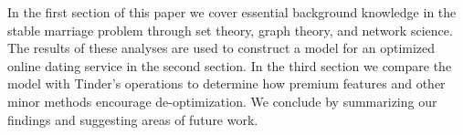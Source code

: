 In the first section of this paper we cover essential background knowledge in the stable marriage problem through set theory, graph theory, and network science. The results of these analyses are used to construct a model for an optimized online dating service in the second section. In the third section we compare the model with Tinder's operations to determine how premium features and other minor methods encourage de-optimization. We conclude by summarizing our findings and suggesting areas of future work.